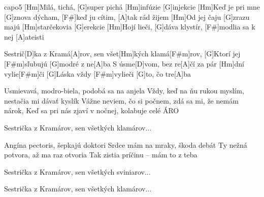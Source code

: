 \hfill capo5
[Hm]Milá, tichá, [G]super pichá [Hm]infúzie [G]injekcie
[Hm]Keď je pri mne [G]znova dýcham, [F#]keď ju cítim, [A]tak rád žijem
[Hm]Od jej čaju [G]zrazu majú [Hm]starčekovia [G]erekcie
[Hm]Hojí lieči, [G]dáva klystír, [F#]modlia sa k nej [A]ateisti

Sestrič[D]ka z Kramá[A]rov, sen všet[Hm]kých klamá[F#m]rov,
[G]Ktorí jej [F#m]sľubujú [G]modré z ne[A]ba
S úsme[D]vom, bez re[A]\null čí za pár [Hm]dní vylie[F#m]\null či
[G]Láska vždy [F#m]vylieči [G]to, čo tre[A]ba

Usmievavá, modro-biela, podobá sa na anjela
Vždy, keď na ňu rukou myslím, nestačia mi dávať kyslík
Vážne neviem, čo si počnem, zdá sa mi, že nemám nárok,
Keď sa pri nás zjaví v nočnej, kolabuje celé ÁRO

Sestrička z Kramárov, sen všetkých klamárov...

Angína pectoris, šepkajú doktori
Srdce mám na mraky, škoda debát
Ty nežná potvora, až ma raz otvoria
Tak zistia príčinu – mám to z teba

Sestrička z Kramárov, sen všetkých sviniarov...

Sestrička z Kramárov, sen všetkých klamárov...


